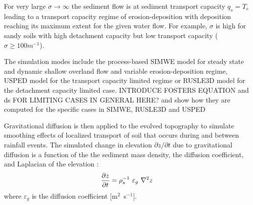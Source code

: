 \documentclass[gmd, manuscript]{copernicus}
\begin{document}
For very large $\sigma \to \infty$ the sediment flow is at sediment transport capacity $q_s = T_c$ 
leading to a transport capacity regime of erosion-deposition with deposition reaching its maximum
extent for the given water flow. 
For example, $\sigma$ is high for sandy soils with high detachment capacity but
low transport capacity  ($\sigma \geq 100 \unit{m}^{-1}$).

The simulation modes include the process-based SIMWE model for
steady state and dynamic shallow overland flow and variable erosion-deposition regime,
USPED model for the transport capacity limited regime or RUSLE3D model for the detachment capacity limited case. 
INTRODUCE FOSTERS EQUATION and ds FOR LIMITING CASES IN GENERAL HERE?
and show how they are computed for the specific cases in SIMWE, RUSLE3D and USPED

\noindent
Gravitational diffusion is then applied to the evolved topography
to simulate smoothing effects of localized transport of soil that
occurs during and between rainfall events.
The simulated change in elevation $\partial z / \partial t$ 
due to gravitational diffusion
is a function of the the sediment mass density,
the diffusion coefficient, and Laplacian of the elevation
\citep{thaxton2004}:
\begin{equation}
\label{eq:grav_diffusion} 
{\partial z \over \partial t }= \rho_s^{-1} ~ \varepsilon_g ~ \nabla^2 z 
\end{equation}
\noindent
where $\varepsilon_g$ is the diffusion coefficient [\unit{m}$^{2}$~\unit{s}$^{-1}$].
\end{document}

